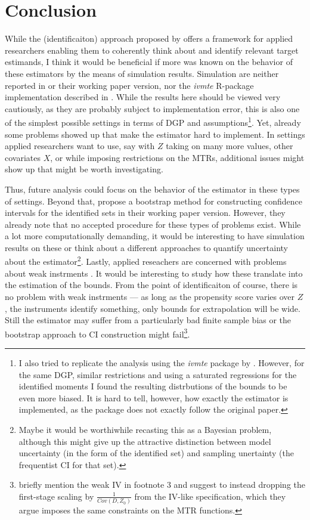 \documentclass{article}
\begin{document}
\section{Conclusion}
While the (identificaiton) approach proposed by \citet{mogstad2018using} offers a framework for applied researchers enabling them to coherently think about and identify relevant target estimands, I think it would be beneficial if more was known on the behavior of these estimators by the means of simulation results.
Simulation are neither reported in \citet{mogstad2018using} or their working paper version, nor the \textit{ivmte} R-package implementation described in \citet{shea2021ivmte}. 
While the results here should be viewed very cautiously, as they are probably subject to implementation error, this is also one of the simplest possible settings in terms of DGP and assumptions\footnote{I also tried to replicate the analysis using the \textit{ivmte} package by \citet{shea2021ivmte}. However, for the same DGP, similar restrictions and using a saturated regressions for the identified moments I found the resulting distrbutions of the bounds to be even more biased. It is hard to tell, however, how exactly the estimator is implemented, as the package does not exactly follow the original \citet{mogstad2018using} paper.}. Yet, already some problems showed up that make the estimator hard to implement.
In settings applied researchers want to use, say with $Z$ taking on many more values, other covariates $X$, or while imposing restrictions on the MTRs, additional issues might show up that might be worth investigating.

Thus, future analysis could focus on the behavior of the estimator in these types of settings.
Beyond that, \citet{mogstad2018using} propose a bootstrap method for constructing confidence intervals for the identified sets in their working paper version.
However, they already note that no accepted procedure for these types of problems exist. While a lot more computationally demanding, it would be interesting to have simulation results on these or think about a different approaches to quantify uncertainty about the estimator\footnote{Maybe it would be worthiwhile recasting this as a Bayesian problem, although this might give up the attractive distinction between model uncertainty (in the form of the identified set) and sampling unertainty (the frequentist CI for that set).}.
Lastly, applied reseachers are concerned with problems about weak instrments \citep{andrews2019weak}. It would be interesting to study how these translate into the estimation of the bounds. 
From the point of identificaiton of course, there is no problem with weak instrments --- as long as the propensity score varies over $Z$, the instruments identify something, only bounds for extrapolation will be wide. Still the estimator may suffer from a particularly bad finite sample bias or the bootstrap approach to CI construction might fail\footnote{\citet{mogstad2018using} briefly mention the weak IV in footnote 3 and suggest to instead dropping the first-stage scaling by $\frac{1}{Cov(D,Z_0)}$ from the IV-like specification, which they argue imposes the same constraints on the MTR functions.}.
\end{document}
